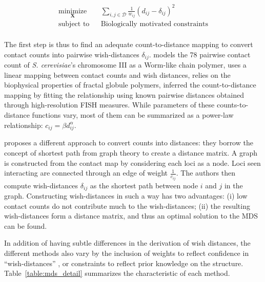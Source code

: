 \documentclass[letterpaper,12pt]{article}
\newcommand{\Xb}{\textbf{X}}
\begin{document}
\begin{equation*}
\renewcommand{\arraystretch}{2}
\begin{array}{ccl}
\underset{\Xb}{\text{minimize}} & & \underset{i, j \in \mathcal{D}}{\sum}
\frac{1}{w_{ij}} (d_{ij} - \delta_{ij})^2 \\
\text{subject to} & & \text{Biologically motivated constraints} \\
\end{array}
\end{equation*}


The first step is thus to find an adequate count-to-distance mapping to
convert contact counts into pairwise wish-distances $\delta_{ij}$.
\citet{dekker:capturing} models the 78 pairwise contact count of {\em S.
cerevisiae}'s chromosome III as a Worm-like chain polymer,
\citet{duan:three-dimensional} uses a linear mapping between contact counts
and wish distances, \citet{ay:three-dimensional} relies on the biophysical
properties of fractal globule polymers, \citet{tanizawa:mapping} inferred the
count-to-distance mapping by fitting the relationship using known pairwise
distances obtained through high-resolution FISH measures. While parameters of
these counts-to-distance functions vary, most of them can be summarized as a
power-law relationship: $c_{ij} = \beta d_{ij}^\alpha$.

\citet{lesne:3d} proposes a different approach to convert counts into
distances: they borrow the concept of shortest path from graph theory to
create a distance matrix. A graph is constructed from the contact map by
considering each loci as a node. Loci seen interacting are connected through
an edge of weight $\frac{1}{c_{ij}}$. The authors then compute wish-distances
$\delta_{ij}$ as the shortest path between node $i$ and $j$ in the graph.
Constructing wish-distances in such a way has two advantages: (i) low contact
counts do not contribute much to the wish-distances; (ii) the resulting
wish-distances form a distance matrix, and thus an optimal solution to the MDS
can be found.

In addition of having subtle differences in the derivation of wish distances,
the different methods also vary by the inclusion of weights to reflect
confidence in ``wish-distances'' \citep{ay:three-dimensional}, or constraints
to reflect prior knowledge on the structure. Table~\ref{table:mds_detail}
summarizes the characteristic of each method.
\end{document}
